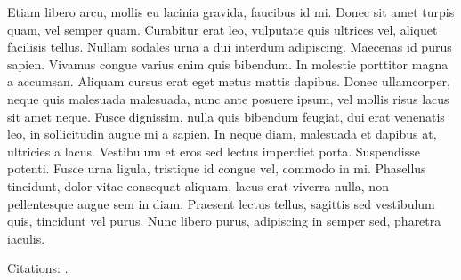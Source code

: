 Etiam libero arcu, mollis eu lacinia gravida, faucibus id mi. Donec sit amet turpis quam, vel semper quam. Curabitur erat leo, vulputate quis ultrices vel, aliquet facilisis tellus. Nullam sodales urna a dui interdum adipiscing. Maecenas id purus sapien. Vivamus congue varius enim quis bibendum. In molestie porttitor magna a accumsan. Aliquam cursus erat eget metus mattis dapibus. Donec ullamcorper, neque quis malesuada malesuada, nunc ante posuere ipsum, vel mollis risus lacus sit amet neque. Fusce dignissim, nulla quis bibendum feugiat, dui erat venenatis leo, in sollicitudin augue mi a sapien. In neque diam, malesuada et dapibus at, ultricies a lacus. Vestibulum et eros sed lectus imperdiet porta. Suspendisse potenti. Fusce urna ligula, tristique id congue vel, commodo in mi. Phasellus tincidunt, dolor vitae consequat aliquam, lacus erat viverra nulla, non pellentesque augue sem in diam. Praesent lectus tellus, sagittis sed vestibulum quis, tincidunt vel purus. Nunc libero purus, adipiscing in semper sed, pharetra iaculis. 

Citations: \cite{example}.
